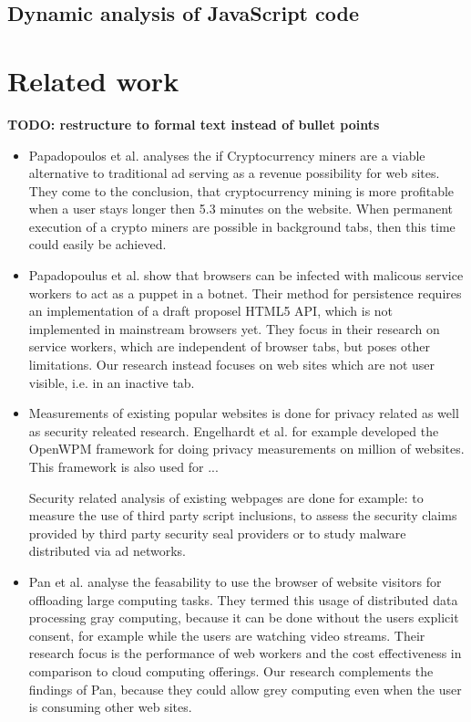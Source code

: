 \documentclass[
	ruledheaders=section,%
	class=report,%
	thesis={type=bachelor},%
	accentcolor=9c,%
	custommargins=true,%
	marginpar=false,%
	parskip=half-,%
	fontsize=11pt,%
]{tudapub}
\begin{document}
  
  \section{Dynamic analysis of JavaScript code}

  

  
  \newpage
  \chapter{Related work}

  \textbf{TODO: restructure to formal text instead of bullet points}

  \begin{itemize}

  \item Papadopoulos et al.\autocite{papadopoulos2018truth} analyses the if Cryptocurrency miners are a viable alternative to traditional ad serving as a revenue possibility for web sites. They come to the conclusion, that cryptocurrency mining is more profitable when a user stays longer then 5.3 minutes on the website. When permanent execution of a crypto miners are possible in background tabs, then this time could easily be achieved.

  \item Papadopoulus et al.\cite{papadopoulos2018master} show that browsers can be infected with malicous service workers to act as a puppet in a botnet. Their method for persistence requires an implementation of a draft proposel HTML5 API, which is not implemented in mainstream browsers yet. They focus in their research on service workers, which are independent of browser tabs, but poses other limitations. Our research instead focuses on web sites which are not user visible, i.e. in an inactive tab.   

    
  \item Measurements of existing popular websites is done for privacy related as well as security releated research. Engelhardt et al.\cite{englehardt2016online} for example developed the OpenWPM framework for doing privacy measurements on million of websites. This framework is also used for ...

    Security related analysis of existing webpages are done for example: to measure the use of third party script inclusions\cite{nikiforakis2012you}, to assess the security claims provided by third party security seal providers\cite{van2014clubbing} or to study malware distributed via ad networks\cite{zarras2014dark}.


  \item Pan et al. analyse the feasability to use the browser of website visitors for offloading large computing tasks\cite{pan2015gray}. They termed this usage of distributed data processing gray computing, because it can be done without the users explicit consent, for example while the users are watching video streams. Their research focus is the performance of web workers and the cost effectiveness in comparison to cloud computing offerings. Our research complements the findings of Pan, because they could allow grey computing even when the user is consuming other web sites.

    
  \end{itemize}
\end{document}
